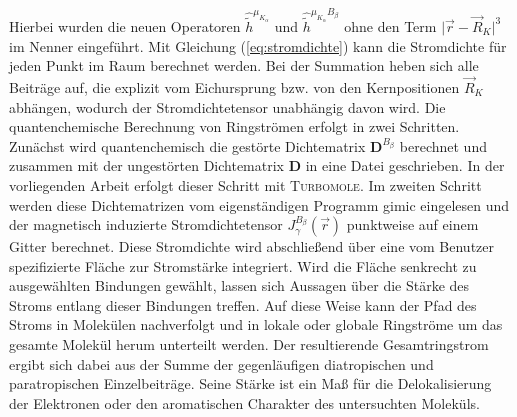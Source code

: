 	Hierbei wurden die neuen Operatoren $\hat{\tilde{h}}^{\mu_{K_\alpha}}$ und $\hat{\tilde{h}}^{\mu_{K_\alpha}B_\beta}$ ohne den Term $\vert\vec{r}-\vec{R}_K\vert^3$ im Nenner eingeführt. Mit Gleichung (\ref{eq:stromdichte}) kann die Stromdichte für jeden Punkt im Raum berechnet werden. Bei der Summation heben sich alle Beiträge auf, die explizit vom Eichursprung bzw. von den Kernpositionen $\vec{R}_K$ abhängen, wodurch der Stromdichtetensor unabhängig davon wird. 
Die quantenchemische Berechnung von Ringströmen erfolgt in zwei Schritten. Zunächst wird quantenchemisch die gestörte Dichtematrix $\boldsymbol{D}^{B_\beta}$ berechnet und zusammen mit der ungestörten Dichtematrix $\boldsymbol D$ in eine Datei geschrieben. In der vorliegenden Arbeit erfolgt dieser Schritt mit \textsc{Turbomole}. Im zweiten Schritt werden diese Dichtematrizen vom eigenständigen Programm \ac{gimic} eingelesen und der magnetisch induzierte Stromdichtetensor $J^{B_\beta}_\gamma(\vec{r})$ punktweise auf einem Gitter berechnet. Diese Stromdichte wird abschließend über eine vom Benutzer spezifizierte Fläche zur Stromstärke integriert. Wird die Fläche senkrecht zu ausgewählten Bindungen gewählt, lassen sich Aussagen über die Stärke des Stroms entlang dieser Bindungen treffen. Auf diese Weise kann der Pfad des Stroms in Molekülen nachverfolgt und in lokale oder globale Ringströme um das gesamte Molekül herum unterteilt werden. Der resultierende Gesamtringstrom ergibt sich dabei aus der Summe der gegenläufigen diatropischen und paratropischen Einzelbeiträge. Seine Stärke ist ein Maß für die Delokalisierung der Elektronen oder den aromatischen Charakter des untersuchten Moleküls.

 